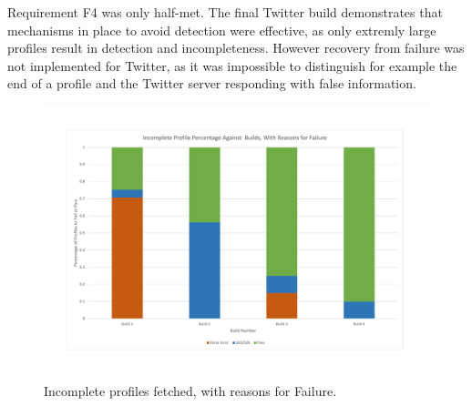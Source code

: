 Requirement F4 was only half-met. The final Twitter build demonstrates that mechanisms in place to avoid detection were effective, as only extremly large profiles result in detection and incompleteness. However recovery from failure was not implemented for Twitter, as it was impossible to distinguish for example the end of a profile and the Twitter server responding with false information. 


\begin{center}
\begin{figure}[h!]
\centering
\includegraphics[width=500px]{Images/failure_rate_and_reason.pdf}
\caption{Incomplete profiles fetched, with reasons for Failure.}
\label{fig:incom_profile_fetched}
\end{figure}
\end{center}



